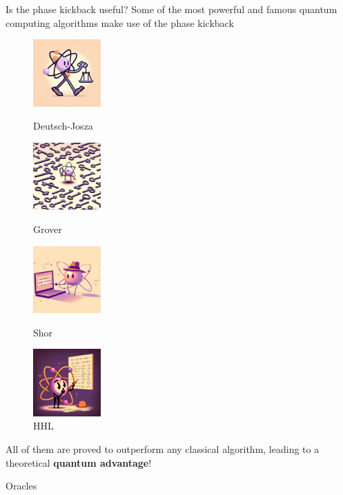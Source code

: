 \documentclass[aspectratio=169, 8pt, xcolor={svgnames}, hyperref={linkcolor=black}]{beamer}
\begin{document}
\begin{frame}{Is the phase kickback useful?}
Some of the most powerful and famous quantum computing algorithms make use of the phase kickback
\begin{multicols}{4}
\begin{figure}
   {\includegraphics[width=0.23\textwidth, height=0.4\textheight]{figures/dj.png}\caption{Deutsch-Josza}}
   {\includegraphics[width=0.23\textwidth, height=0.4\textheight]{figures/grover.png}\caption{Grover}}
   {\includegraphics[width=0.23\textwidth, height=0.4\textheight]{figures/shor.png}\caption{Shor}}
   {\includegraphics[width=0.23\textwidth, height=0.4\textheight]{figures/hhl.png}\caption{HHL}}
\end{figure}
\end{multicols}
All of them are proved to outperform any classical algorithm, leading to a theoretical \textbf{quantum 
advantage}!
\end{frame}

\begin{frame}{Oracles}

\end{frame}
\end{document}
